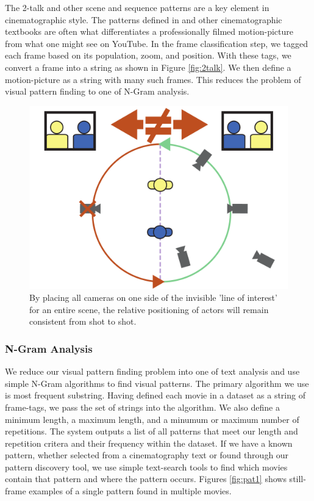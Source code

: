 The 2-talk and other scene and sequence patterns are a key element in cinematographic style. The patterns defined in \cite{arijon_grammar_1991} and other cinematographic textbooks are often what differentiates a professionally filmed motion-picture from what one might see on YouTube. In the frame classification step, we tagged each frame based on its population, zoom, and position. With these tags, we convert a frame into a string as shown in Figure \ref{fig:2talk}. We then define a motion-picture as a string with many such frames. This reduces the problem of visual pattern finding to one of N-Gram analysis.

\begin{figure}[tb]
\begin{center}
\includegraphics[width=0.98\linewidth]
    {fig/lineOfAction.pdf}
\end{center}
\caption{By placing all cameras on one side of the invisible 'line of interest' for an entire scene, the relative positioning of actors will remain consistent from shot to shot.}
\label{fig:lineOfInterest}
\end{figure}

\subsubsection*{N-Gram Analysis}

We reduce our visual pattern finding problem into one of text analysis and use simple N-Gram algorithms to find visual patterns. The primary algorithm we use is most frequent substring. Having defined each movie in a dataset as a string of frame-tags, we pass the set of strings into the algorithm. We also define a minimum length, a maximum length, and a minumum or maximum number of repetitions. The system outputs a list of all patterns that meet our length and repetition critera and their frequency within the dataset. If we have a known pattern, whether selected from a cinematography text or found through our pattern discovery tool, we use simple text-search tools to find which movies contain that pattern and where the pattern occurs. Figures \ref{fig:pat1} shows still-frame examples of a single pattern found in multiple movies.

